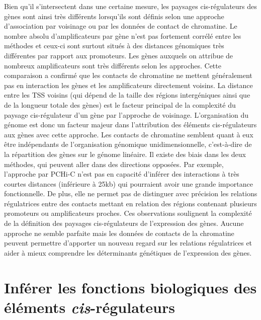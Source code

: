 Bien qu’il s’intersectent dans une certaine mesure, les paysages \gls{cis}-régulateurs des gènes sont ainsi très différents lorsqu’ils sont définis selon une approche d’association par voisinage ou par les données de contact de chromatine. Le nombre absolu d’amplificateurs par gène n’est pas fortement corrélé entre les méthodes et ceux-ci sont surtout situés à des distances génomiques très différentes par rapport aux promoteurs. Les gènes auxquels on attribue de nombreux amplificateurs sont très différents selon les approches. Cette comparaison a confirmé que les contacts de chromatine ne mettent généralement pas en interaction les gènes et les amplificateurs directement voisins. La distance entre les \acrshort{TSS} voisins (qui dépend de la taille des régions intergéniques ainsi que de la longueur totale des gènes) est le facteur principal de la complexité du paysage \gls{cis}-régulateur d’un gène par l’approche de voisinage. L’organisation du génome est donc un facteur majeur dans l’attribution des éléments \gls{cis}-régulateurs aux gènes avec cette approche. Les contacts de chromatine semblent quant à eux être indépendants de l’organisation génomique unidimensionnelle, c’est-à-dire de la répartition des gènes sur le génome linéaire. Il existe des biais dans les deux méthodes, qui peuvent aller dans des directions opposées. Par exemple, l’approche par \gls{PCHi-C} n’est pas en capacité d’inférer des interactions à très courtes distances (inférieure à 25kb) qui pourraient avoir une grande importance fonctionnelle. De plus, elle ne permet pas de distinguer avec précision les relations régulatrices entre des contacts mettant en relation des régions contenant plusieurs promoteurs ou amplificateurs proches. Ces observations soulignent la complexité de la définition des paysages \gls{cis}-régulateurs de l’expression des gènes. Aucune approche ne semble parfaite mais les données de contacts de la chromatine peuvent permettre d’apporter un nouveau regard sur les relations régulatrices et aider à mieux comprendre les déterminants génétiques de l’expression des gènes. 


\section{Inférer les fonctions biologiques des éléments \textit{cis}-régulateurs}
\label{sec:inferer-fonction}

